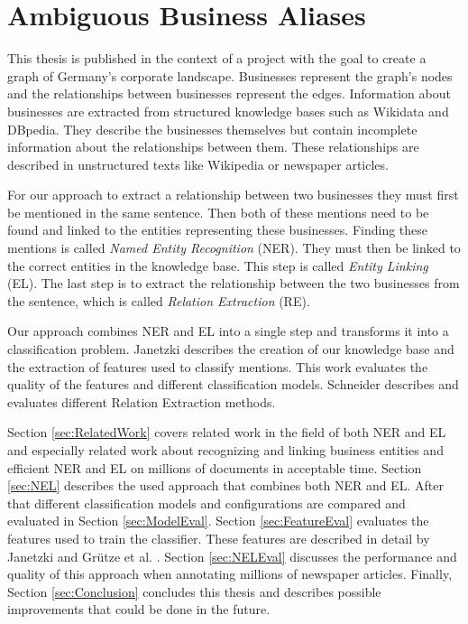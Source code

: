 \section{Ambiguous Business Aliases}
\label{sec:introduction}

This thesis is published in the context of a project with the goal to create a graph of Germany's corporate landscape. Businesses represent the graph's nodes and the relationships between businesses represent the edges. Information about businesses are extracted from structured knowledge bases such as Wikidata and DBpedia. They describe the businesses themselves but contain incomplete information about the relationships between them. These relationships are described in unstructured texts like Wikipedia or newspaper articles.\par
For our approach to extract a relationship between two businesses they must first be mentioned in the same sentence. Then both of these mentions need to be found and linked to the entities representing these businesses. Finding these mentions is called \textit{Named Entity Recognition} (NER). They must then be linked to the correct entities in the knowledge base. This step is called \textit{Entity Linking} (EL). The last step is to extract the relationship between the two businesses from the sentence, which is called \textit{Relation Extraction} (RE).\par
Our approach combines NER and EL into a single step and transforms it into a classification problem. Janetzki \cite{janetzki} describes the creation of our knowledge base and the extraction of features used to classify mentions. This work evaluates the quality of the features and different classification models. Schneider \cite{schneider} describes and evaluates different Relation Extraction methods.\par
Section \ref{sec:RelatedWork} covers related work in the field of both NER and EL and especially related work about recognizing and linking business entities and efficient NER and EL on millions of documents in acceptable time. Section \ref{sec:NEL} describes the used approach that combines both NER and EL. After that different classification models and configurations are compared and evaluated in Section \ref{sec:ModelEval}. Section \ref{sec:FeatureEval} evaluates the features used to train the classifier. These features are described in detail by Janetzki \cite{janetzki} and Grütze et al. \cite{coheel}. Section \ref{sec:NELEval} discusses the performance and quality of this approach when annotating millions of newspaper articles. Finally, Section \ref{sec:Conclusion} concludes this thesis and describes possible improvements that could be done in the future.

